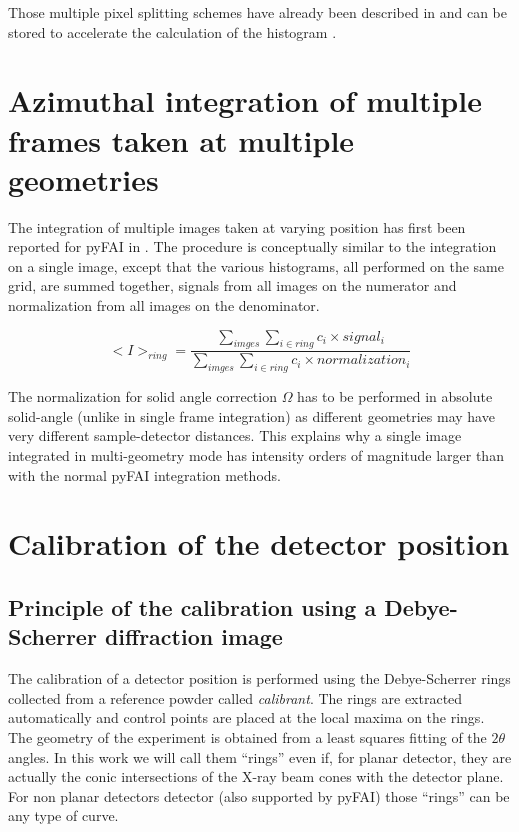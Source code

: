 \documentclass[preprint, pdf]{iucr}              %
\begin{document}
Those multiple pixel splitting schemes have already been described in
 \cite{fv5028} and can be stored to accelerate the calculation of the
histogram  \cite{kieffer_ashiotis-proc-euroscipy-2014}.

\section{Azimuthal integration of multiple frames taken at multiple geometries}

The integration of multiple images taken at varying position has first been
reported for pyFAI in  \cite{PyFAI_PDJ}. 
The procedure is conceptually similar to the integration on a single image,
except that the various histograms, all performed on the same grid, are summed
together, signals from all images on the numerator and normalization from all
images on the denominator.

$$
<I>_{ring} = \frac{\sum\limits_{imges} \sum\limits_{i \in ring} c_i \times
signal_i} {\sum\limits_{imges} \sum\limits_{i \in ring} c_i \times
normalization_i} 
$$

The normalization for solid angle correction $\Omega$ has to be performed in
absolute solid-angle (unlike in single frame integration) as different
geometries may have very different sample-detector distances. 
This explains why a single image integrated in multi-geometry mode  has
intensity orders of magnitude larger than with the normal pyFAI integration
methods.

\section{Calibration of the detector position}

\subsection{Principle of the calibration using a Debye-Scherrer diffraction
image}
The calibration of a detector position is performed using the Debye-Scherrer
rings collected from a reference powder called \textit{calibrant}.
The rings are extracted automatically and control points are placed at the
local maxima on the rings.
The geometry of the experiment is obtained from a least squares fitting of
the $2\theta$ angles.
In this work we will call them ``rings'' even if, for planar detector,
they are actually the conic intersections of the X-ray beam cones
with the detector plane.
For non planar detectors detector (also supported by pyFAI) those ``rings'' can
be any type of curve.
\end{document}
